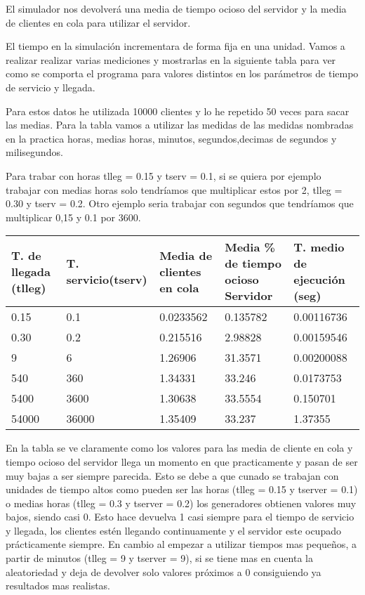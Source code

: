 \documentclass[]{article}
\begin{document}
El simulador nos devolverá una media de tiempo ocioso del servidor y la media de clientes en cola para utilizar el servidor. 

El tiempo en la simulación incrementara de forma fija en una unidad.
Vamos a realizar realizar varias mediciones y mostrarlas en la siguiente tabla para ver como se comporta el programa para valores distintos en los parámetros de tiempo de servicio y llegada. 

Para estos datos he utilizada 10000 clientes y lo he repetido 50 veces para sacar las medias.
Para la tabla vamos a utilizar las medidas de las medidas nombradas en la practica horas, medias horas, minutos, segundos,decimas de segundos y milisegundos.

Para trabar con horas tlleg = 0.15 y tserv = 0.1, si se quiera por ejemplo trabajar con medias horas solo tendríamos que multiplicar estos por 2, tlleg = 0.30 y tserv = 0.2. Otro ejemplo seria trabajar con segundos que tendríamos que multiplicar 0,15 y 0.1 por 3600.

\begin{table}[H]
	\begin{center}
		\begin{tabularx}{0.9\textwidth}{|X|X|X|X|X|}
			\hline
			\textbf{T. de llegada (tlleg)} & \textbf{T. servicio(tserv)}&\textbf{Media de clientes en cola} & \textbf{Media \% de tiempo ocioso Servidor} & \textbf{T. medio de ejecución (seg)} \\
			\hline \hline
			  0.15 & 0.1 & 0.0233562 & 0.135782 &0.00116736\\ \hline
			  0.30 & 0.2 & 0.215516 & 2.98828 &0.00159546 \\ \hline
			  9 & 6& 1.26906 &31.3571  &0.00200088\\ \hline
			  540 & 360 & 1.34331 & 33.246 &0.0173753\\ \hline
			  5400 & 3600 & 1.30638 & 33.5554 &0.150701\\ \hline
			  54000 & 36000 & 1.35409  & 33.237 & 1.37355 \\ \hline

		\end{tabularx}

	\end{center}
\end{table}

En la tabla se ve claramente como los valores para las media de cliente en cola y tiempo ocioso del servidor llega un momento en que practicamente y pasan de ser muy bajas a ser siempre parecida. Esto se debe a que cunado se trabajan con unidades de tiempo altos como pueden ser las horas (tlleg = 0.15 y tserver = 0.1) o medias horas (tlleg = 0.3 y tserver = 0.2) los generadores obtienen valores muy bajos, siendo casi 0. Esto hace devuelva 1 casi siempre para el tiempo de servicio y llegada, los clientes estén llegando continuamente y el servidor este ocupado prácticamente siempre. En cambio al empezar a utilizar tiempos mas pequeños, a partir de minutos (tlleg = 9 y tserver = 9), si se tiene mas en cuenta la aleatoriedad y deja de devolver solo valores próximos a 0 consiguiendo ya resultados mas realistas.
\newline
\end{document}
